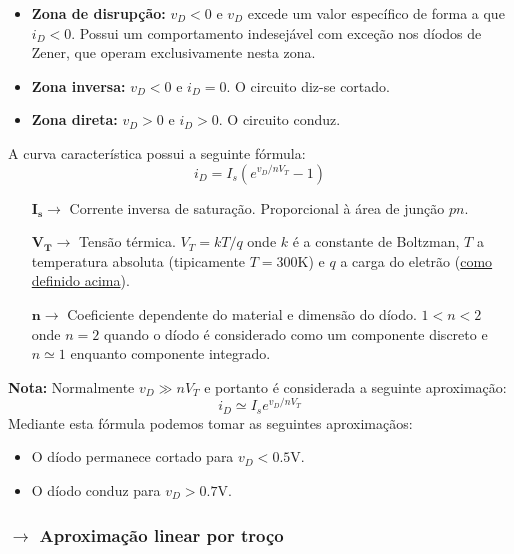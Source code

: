 \begin{itemize}
    \item \textbf{Zona de disrupção:} $v_D < 0$ e $v_D$ excede um valor específico de forma a que $i_D < 0$. Possui um comportamento indesejável com exceção nos díodos de Zener, que operam exclusivamente nesta zona.
    \item \textbf{Zona inversa:} $v_D < 0$ e $i_D = 0$. O circuito diz-se cortado.
    \item \textbf{Zona direta:} $v_D > 0$ e $i_D > 0$. O circuito conduz.
    \end{itemize}


\newpage
\noindent A curva característica possui a seguinte fórmula:
$$
    \boxed{i_D = I_s(e^{v_D/nV_T} - 1)}
$$
\begin{itemize}
    \item[$\pmb{I_s \rightarrow}$] Corrente inversa de saturação. Proporcional à área de junção $pn$.
    \item[$\pmb{V_T \rightarrow}$] Tensão térmica. $V_T = k T/ q$ onde $k$ é a constante de Boltzman, $T$ a temperatura absoluta (tipicamente $T = 300$K) e $q$ a carga do eletrão (\hyperref[subsec:current-flow-semiconductors]{como definido acima}).
    \item[$\pmb{n \rightarrow}$] Coeficiente dependente do material e dimensão do díodo. $1 < n < 2$ onde $n = 2$ quando o díodo é considerado como um componente discreto e $n \simeq 1$ enquanto componente integrado.
\end{itemize}

\noindent\textbf{Nota:} Normalmente $v_D \gg n V_T$ e portanto é considerada a seguinte aproximação:
$$
    \boxed{i_D \simeq I_s e^{v_D/nV_T}}
$$
Mediante esta fórmula podemos tomar as seguintes aproximaçãos:
\begin{itemize}
    \item O díodo permanece cortado para $v_D < 0.5$V.
    \item O díodo conduz para $v_D > 0.7$V.
\end{itemize}

\subsubsection[2.1.1 Aproximação linear por troço]{$\pmb{\rightarrow}$ Aproximação linear por troço}

